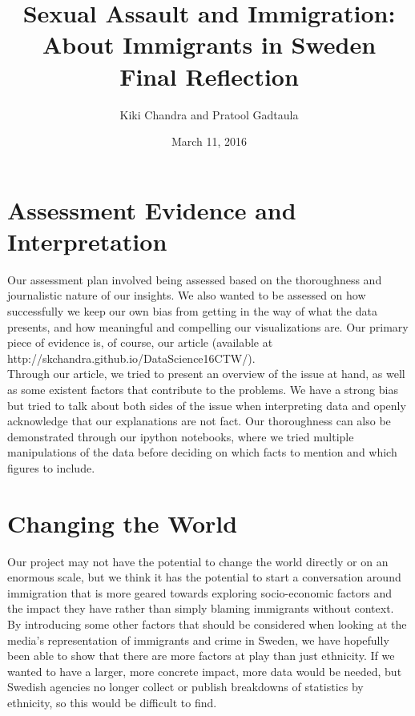 \documentclass[10pt]{article}
\title{Sexual Assault and Immigration:\\
		\Large About Immigrants in Sweden \\
		\Large Final Reflection}
\author{Kiki Chandra and Pratool Gadtaula}
\date{March 11, 2016}
\begin{document}
\maketitle

\section{Assessment Evidence and Interpretation}
	Our assessment plan involved being assessed based on the thoroughness and journalistic nature of our insights. We also wanted to be assessed on how successfully we keep our own bias from getting in the way of what the data presents, and how meaningful and compelling our visualizations are. Our primary piece of evidence is, of course, our article (available at http://skchandra.github.io/DataScience16CTW/).\\
	Through our article, we tried to present an overview of the issue at hand, as well as some existent factors that contribute to the problems. We have a strong bias but tried to talk about both sides of the issue when interpreting data and openly acknowledge that our explanations are not fact. Our thoroughness can also be demonstrated through our ipython notebooks, where we tried multiple manipulations of the data before deciding on which facts to mention and which figures to include. 
	
\section{Changing the World}
Our project may not have the potential to change the world directly or on an enormous scale, but we think it has the potential to start a conversation around immigration that is more geared towards exploring socio-economic factors and the impact they have rather than simply blaming immigrants without context. By introducing some other factors that should be considered when looking at the media’s representation of immigrants and crime in Sweden, we have hopefully been able to show that there are more factors at play than just ethnicity. If we wanted to have a larger, more concrete impact, more data would be needed, but Swedish agencies no longer collect or publish breakdowns of statistics by ethnicity, so this would be difficult to find. 
\end{document}
